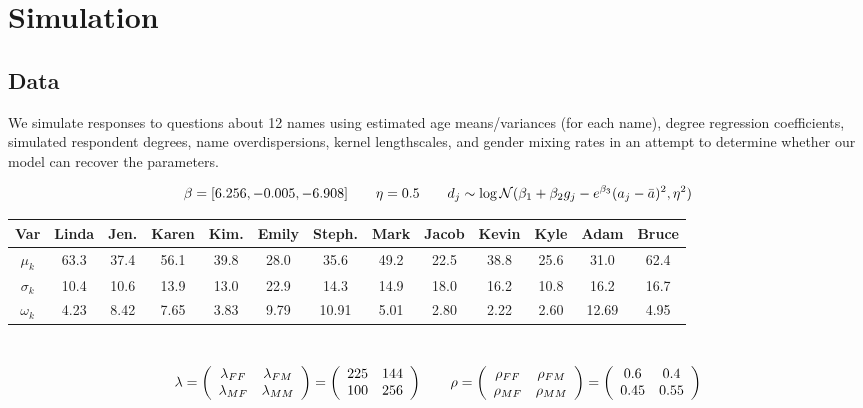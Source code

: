 \documentclass[12pt]{article}
\begin{document}
\section{Simulation}
\subsection{Data}
We simulate responses to questions about 12 names using estimated age means/variances (for each name), degree regression coefficients, simulated respondent degrees, name overdispersions, kernel lengthscales, and gender mixing rates in an attempt to determine whether our model can recover the parameters. 

$$
\beta = [6.256, -0.005, -6.908] 
\hspace{20 pt}
\eta = 0.5 
\hspace{20 pt}
d_j \sim \log\mathcal{N}(\beta_1 + \beta_2 g_j - e^{\beta_3} (a_j - \bar{a})^2, \eta^2)
$$

\noindent \begin{tabular}{c | cccccccccccc} 
Var & Linda & Jen. & Karen & Kim. & Emily & Steph. & Mark & Jacob & Kevin & Kyle & Adam & Bruce \\
\hline
$\mu_k$ & 63.3 & 37.4 & 56.1 & 39.8 & 28.0 & 35.6 & 49.2 & 22.5 & 38.8  & 25.6 & 31.0 & 62.4 \\
$\sigma_k$ & 10.4 & 10.6 & 13.9 & 13.0 & 22.9 & 14.3 & 14.9 & 18.0 & 16.2 & 10.8 & 16.2 & 16.7  \\
$\omega_k$ & 4.23 & 8.42 & 7.65 & 3.83 & 9.79 & 10.91 & 5.01 & 2.80 & 2.22 & 2.60 & 12.69 & 4.95  \\
\end{tabular}\\

$$ \lambda
= \left( \begin{array}{cc} \lambda_{FF} & \lambda_{FM} \\
\lambda_{MF} & \lambda_{MM} \end{array} \right) 
= \left( \begin{array}{cc}
225 & 144 \\
100 & 256 \end{array} \right)
\hspace{20 pt}
\rho
= \left( \begin{array}{cc} \rho_{FF} & \rho_{FM} \\
\rho_{MF} & \rho_{MM} \end{array} \right) 
= \left( \begin{array}{cc}
0.6 & 0.4 \\
0.45 & 0.55 \end{array} \right) $$ \vspace{7 pt}
\end{document}
